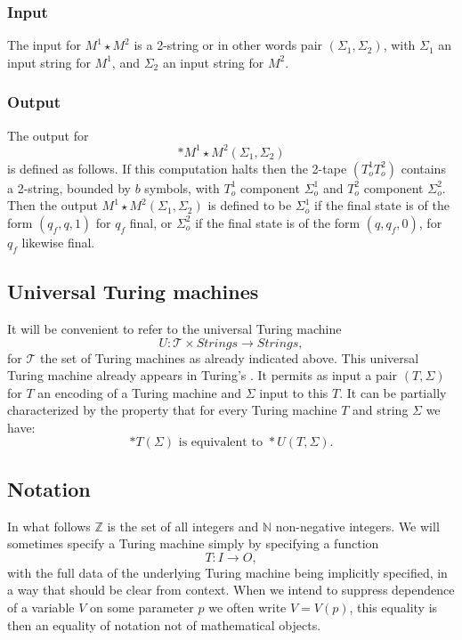 \documentclass{amsart}  %
\numberwithin{equation}{section}
\theoremstyle{definition}
\theoremstyle{remark}
\begin{document}
{\subsubsection {Input}
The input for $M ^{1} \star M ^{2}  $ is a 2-string or in other words pair $(\Sigma _{1}, \Sigma _{2}  )$, with $\Sigma _{1} $ an input string for $M ^{1} $, and $\Sigma _{2} $ an input string for $M ^{2} $.
\subsubsection {Output} The output for $$*M ^{1} \star M ^{2} (\Sigma _{1}, \Sigma _{2}  )  $$ is defined as follows. If this computation halts then the 2-tape $(T ^{1} _{o} T ^{2} _{o}    )$ contains a 2-string, bounded by $b$ symbols, with $T ^{1} _{o}  $ component $\Sigma ^{1} _{o}$ and $T ^{2} _{o}  $ component $\Sigma ^{2} _{o}$.
Then the output $M ^{1} \star M ^{2} (\Sigma _{1}, \Sigma _{2}  )$ is defined to be $\Sigma ^{1} _{o}  $ if the final state is of the form $(q _{f},  q, 1) $ for $q _{f} $ final, or $\Sigma ^{2} _{o}  $ if the final state is of the form $(q,  q _{f},0) $, for $q _{f} $ likewise final. 
\subsection {Universal Turing machines} It will be convenient to refer to the universal Turing machine $$U: \mathcal{T} \times Strings \to Strings,$$ for $\mathcal{T}$ the set of Turing machines as already indicated above.
This universal Turing machine already appears in Turing's \cite{TuringComputableNumbers}. It permits as input a pair $(T,\Sigma)$ for $T$ an encoding of a Turing machine and $\Sigma$ input to this $T$. It can be partially characterized by the property that for every Turing machine $T$ and string $\Sigma$ we have: \begin{equation*} *T (\Sigma) \text{ is equivalent to } *U (T,\Sigma).
\end{equation*}
\subsection {Notation}
In what follows $\mathbb{Z}$ is the set of all integers and $\mathbb{N}$ non-negative integers. 
 We will sometimes specify a Turing machine simply by specifying a function $$T: {I} \to {O},$$ with the full data of the underlying Turing machine being implicitly specified, in a way that should be clear from context.  
When we intend to suppress dependence of a variable $V$ on some parameter $p$ we often write $V=V (p)$, this equality is then an equality of notation not of mathematical objects.
}
\end{document}
